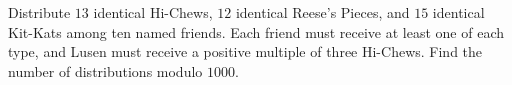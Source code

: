 Distribute $13$ identical Hi-Chews, $12$ identical Reese's Pieces, and $15$ identical Kit-Kats among ten named friends. Each friend must receive at least one of each type, and Lusen must receive a positive multiple of three Hi-Chews. Find the number of distributions modulo $1000$.
